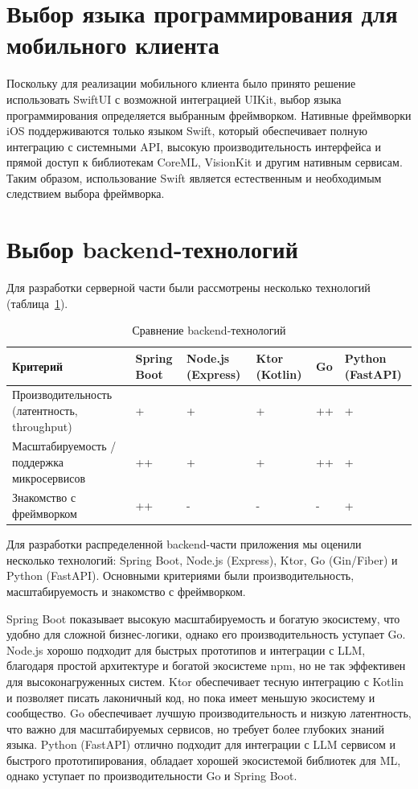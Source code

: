\section{Выбор языка программирования для мобильного клиента}


Поскольку для реализации мобильного клиента было принято решение использовать SwiftUI с возможной интеграцией UIKit, выбор языка программирования определяется выбранным фреймворком. Нативные фреймворки iOS поддерживаются только языком Swift, который обеспечивает полную интеграцию с системными API, высокую производительность интерфейса и прямой доступ к библиотекам CoreML, VisionKit и другим нативным сервисам. Таким образом, использование Swift является естественным и необходимым следствием выбора фреймворка.


\section{Выбор backend-технологий}


Для разработки серверной части были рассмотрены несколько технологий (таблица~\ref{tab:backend}).


\begin{table}[htbp]
	\centering
	\caption{Сравнение backend-технологий}
	\label{tab:backend}
	\small
	
\begin{tabular}{|>{\small}p{3.5cm}|>{\small}p{2.0cm}|>{\small}p{2.0cm}|>{\small}p{2.0cm}|>{\small}p{1.5cm}|>{\small}p{2.0cm}|}
	\hline
		Критерий & Spring Boot & Node.js (Express) & Ktor (Kotlin) & Go & Python (FastAPI) \\
	\hline
		Произ\-во\-ди\-тель\-ность (ла\-тент\-ность, through\-put) & + & + & + & ++ & + \\
	\hline
		Масштабируемость / поддержка микросервисов & ++ & + & + & ++ & + \\
	\hline
		Знакомство с фреймворком & ++ & - & - & - & + \\
	\hline
	\end{tabular}

\end{table}


Для разработки распределенной backend-части приложения мы оценили несколько технологий: Spring Boot, Node.js (Express), Ktor, Go (Gin/Fiber) и Python (FastAPI). Основными критериями были производительность, масштабируемость и знакомство с фреймворком.


Spring Boot показывает высокую масштабируемость и богатую экосистему, что удобно для сложной бизнес-логики, однако его производительность уступает Go. Node.js хорошо подходит для быстрых прототипов и интеграции с LLM, благодаря простой архитектуре и богатой экосистеме npm, но не так эффективен для высоконагруженных систем. Ktor обеспечивает тесную интеграцию с Kotlin и позволяет писать лаконичный код, но пока имеет меньшую экосистему и сообщество. Go обеспечивает лучшую производительность и низкую латентность, что важно для масштабируемых сервисов, но требует более глубоких знаний языка. Python (FastAPI) отлично подходит для интеграции с LLM сервисом и быстрого прототипирования, обладает хорошей экосистемой библиотек для ML, однако уступает по производительности Go и Spring Boot.


